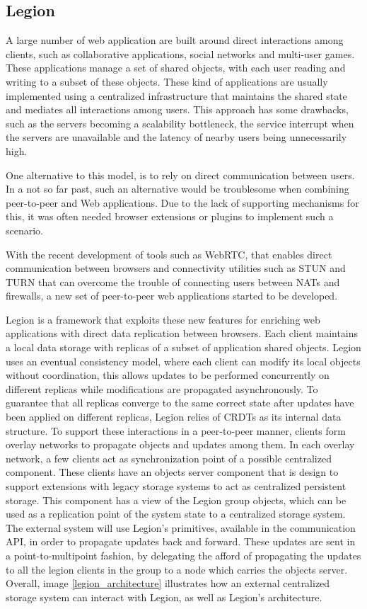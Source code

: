 \subsection{Legion}
\label{sec:legion_intro}
A large number of web application are built around direct interactions among clients, such as collaborative applications, social networks and multi-user games. These applications manage a set of shared objects, with each user reading and writing to a subset of these objects. These kind of applications are usually implemented using a centralized infrastructure that maintains the shared state and mediates all interactions among users. This approach has some drawbacks, such as the servers becoming a scalability bottleneck, the service interrupt when the servers are unavailable and the latency of nearby users being unnecessarily high.\par
	One alternative to this model, is to rely on direct communication between users. In a not so far past, such an alternative would be troublesome when combining peer-to-peer and Web applications. Due to the lack of supporting mechanisms for this, it was often needed browser extensions or plugins to implement such a scenario.\par
	With the recent development of tools such as WebRTC, that enables direct communication between browsers and connectivity utilities such as STUN and TURN that can overcome the trouble of connecting users between NATs and firewalls, a new set of peer-to-peer web applications started to be developed.\par
	Legion is a framework that exploits these new features for enriching web applications with direct data replication between browsers. Each client maintains a local data storage with replicas of a subset of application shared objects. Legion uses an eventual consistency model, where each client can modify its local objects without coordination, this allows updates to be performed concurrently on different replicas while modifications are propagated asynchronously. To guarantee that all replicas converge to the same correct state after updates have been applied on different replicas, Legion relies of CRDTs as its internal data structure. To support these interactions in a peer-to-peer manner, clients form overlay networks to propagate objects and updates among them. In each overlay network, a few clients act as synchronization point of a possible centralized component. These clients have an objects server component that is design to support extensions with legacy storage systems to act as centralized persistent storage. This component has a view of the Legion group objects, which can be used as a replication point of the system state to a centralized storage system. The external system will use Legion's primitives, available in the communication API, in order to propagate updates back and forward. These updates are sent in a point-to-multipoint fashion, by delegating the afford of propagating the updates to all the legion clients in the group to a node which carries the objects server. Overall, image \ref{legion_architecture} illustrates how an external centralized storage system can interact with Legion, as well as Legion's architecture.
	
